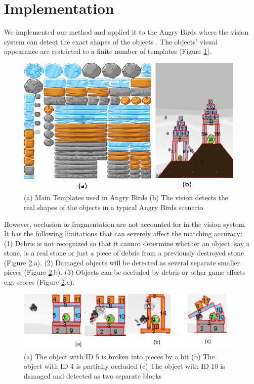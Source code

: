 \documentclass[letterpaper]{article}
\begin{document}
\section{Implementation}
We implemented our method and applied it to the Angry Birds where the vision system can detect the exact shapes of the objects \cite{andrewwang}. The objects' visual appearance are restricted to a finite number of templates (Figure \ref{Templates}).  
\begin{figure}[t!]
\centering\includegraphics[scale=0.28]{Templates2.png}\caption{(a) Main Templates used in Angry Birds (b) The vision detects the real shapes of the objects in a typical Angry Birds scenario}
\label{Templates}
\vspace{-4mm}
\end{figure}
However, occlusion or fragmentation are not accounted for in the vision system.
It has the following limitations that can severely affect the matching accuracy: (1) Debris is not recognized so that it cannot determine whether an object, say a stone, is a real stone or just a piece of debris from a previously destroyed stone (Figure \ref{Fragments}.a). (2) Damaged objects will be detected as several separate smaller pieces (Figure \ref{Fragments}.b). (3) Objects can be occluded by debris or other game effects e.g. scores (Figure \ref{Fragments}.c).
\begin{figure}[t!]
\centering\includegraphics[scale=0.6]{Fragmentation2.png}\caption{(a) The object with ID 5 is broken into pieces by a hit (b) The object with ID 4 is partially occluded (c) The object with ID 10 is damaged and detected as two separate blocks}
\label{Fragments}
\vspace{-5mm}
\end{figure}
\end{document}
